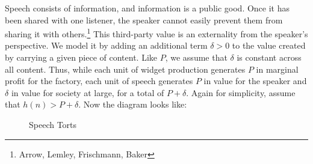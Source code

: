 Speech consists of information, and information is a public good. Once it has been shared with one listener, the speaker cannot easily prevent them from sharing it with others.\footnote{Arrow, Lemley, Frischmann, Baker} This third-party value is an externality from the speaker's perspective. We model it by adding an additional term $\delta > 0$ to the value created by carrying a given piece of content. Like $P$, we assume that $\delta$ is constant across all content. Thus, while each unit of widget production generates $P$ in marginal profit for the factory, each unit of speech generates $P$ in value for the speaker and $\delta$ in value for society at large, for a total of $P + \delta$. Again for simplicity, assume that $h(n) > P + \delta$. Now the diagram looks like:
\begin{figure}[h]
    \centering
{}
    \caption{Speech Torts}
    \label{fig:nonspeech}
\end{figure}
